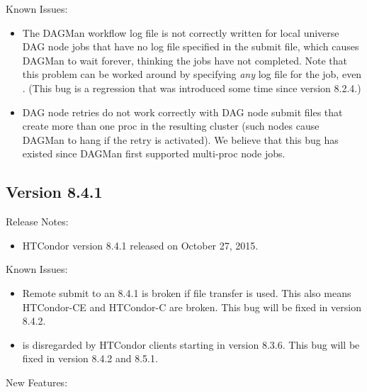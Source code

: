 \noindent Known Issues:

\begin{itemize}

\item The DAGMan workflow log file is not correctly written for local
universe DAG node jobs that have no log file specified in the submit file,
which causes DAGMan to wait forever, thinking the jobs have not completed.
Note that this problem can be worked around by specifying \emph{any}
log file for the job, even .
(This bug is a regression that was introduced some time since version
8.2.4.)

\item DAG node retries do not work correctly with DAG node submit files
that create more than one proc in the resulting cluster (such nodes
cause DAGMan to hang if the retry is activated).
We believe that this bug has existed since DAGMan first supported
multi-proc node jobs.

\end{itemize}

\subsection*{\label{sec:New-8-4-1}Version 8.4.1}

\noindent Release Notes:

\begin{itemize}

\item HTCondor version 8.4.1 released on October 27, 2015.

\end{itemize}

\noindent Known Issues:
\begin{itemize}
\item Remote submit to an 8.4.1  is broken if file transfer is
used.  This also means HTCondor-CE and HTCondor-C are broken.  This bug will
be fixed in version 8.4.2.

\item {} is disregarded by HTCondor clients
starting in version 8.3.6.  This bug will be fixed in version 8.4.2 and 8.5.1.
\end{itemize}


\noindent New Features:

